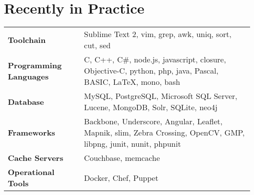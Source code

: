 \section{ Recently in Practice}
\noindent \begin{tabular}{ l p{10.5cm} }
\textbf{Toolchain} & Sublime Text 2, vim, grep, awk, uniq, sort, cut, sed\\[0.4em]
\textbf{Programming Languages} & C, C++, C\#, node.js, javascript, closure, Objective-C, python, php, java, Pascal, BASIC, LaTeX, mono, bash\\[0.4em]
\textbf{Database} & MySQL, PostgreSQL, Microsoft SQL Server, Lucene, MongoDB, Solr, SQLite, neo4j\\[0.4em]
\textbf{Frameworks} & Backbone, Underscore, Angular, Leaflet, Mapnik, slim, Zebra Crossing, OpenCV, GMP, libpng, junit, nunit, phpunit\\[0.4em]
\textbf{Cache Servers} & Couchbase, memcache\\[0.4em]
\textbf{Operational Tools} & Docker, Chef, Puppet\\
\end{tabular}
\smallskip
